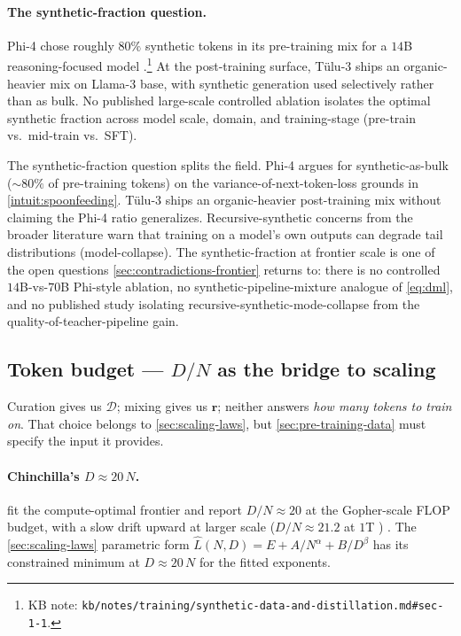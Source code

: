 \paragraph{The synthetic-fraction question.}
Phi-4 chose roughly $80\%$ synthetic tokens in its pre-training mix
for a $14$B reasoning-focused model
\citep[\S 1, \S 2.2]{phi4}.\footnote{KB note:
\nolinkurl{kb/notes/training/synthetic-data-and-distillation.md#sec-1-1}.}
At the post-training surface, Tülu-3 \citep{tulu3} ships an
organic-heavier mix on Llama-3 base, with synthetic generation used
selectively rather than as bulk. No published large-scale controlled
ablation isolates the optimal synthetic fraction across model scale,
domain, and training-stage (pre-train vs.\ mid-train vs.\ SFT).

\begin{contradiction}
\label{contra:synthetic-fraction}
The synthetic-fraction question splits the field. Phi-4
\citep[abstract]{phi4} argues for synthetic-as-bulk
($\sim\!80\%$ of pre-training tokens) on the
variance-of-next-token-loss grounds in
\cref{intuit:spoonfeeding}. Tülu-3 \citep{tulu3} ships an
organic-heavier post-training mix without claiming the Phi-4 ratio
generalizes. Recursive-synthetic concerns from the broader
literature \citep[\S 1]{phi4} warn that training on a model's own
outputs can degrade tail distributions
(model-collapse). The synthetic-fraction at frontier scale is one
of the open questions
\cref{sec:contradictions-frontier} returns to: there is no
controlled $14$B-vs-$70$B Phi-style ablation, no
synthetic-pipeline-mixture analogue of \cref{eq:dml}, and no
published study isolating
recursive-synthetic-mode-collapse from the
quality-of-teacher-pipeline gain.
\end{contradiction}

\subsection{Token budget --- $D / N$ as the bridge to scaling}
\label{sec:data-budget}

Curation gives us $\mathcal{D}$; mixing gives us $\mathbf{r}$;
neither answers \emph{how many tokens to train on}. That choice
belongs to \cref{sec:scaling-laws}, but \cref{sec:pre-training-data}
must specify the input it provides.

\paragraph{Chinchilla's $D \approx 20\,N$.}
\citet[\S 4.1, Table 4]{hoffmann2022-chinchilla} fit the
compute-optimal frontier and report $D / N \approx 20$ at the
Gopher-scale FLOP budget, with a slow drift upward at larger scale
($D / N \approx 21.2$ at $1$T )
\citep[\S 3, Table 3]{hoffmann2022-chinchilla}. The
\cref{sec:scaling-laws} parametric form
$\hat{L}(N, D) = E + A / N^{\alpha} + B / D^{\beta}$ has its
constrained minimum at $D \approx 20\,N$ for the fitted exponents.

